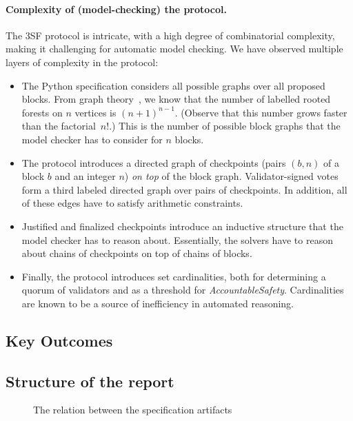 \paragraph{Complexity of (model-checking) the protocol.} The 3SF protocol is
intricate, with a high degree of combinatorial complexity, making it challenging
for automatic model checking. We have observed multiple layers of complexity in the protocol:
\begin{itemize}
  \item The Python specification considers all possible graphs over all proposed
    blocks. From graph theory~\cite{cayley1878theorem}, we know that the number
    of labelled rooted forests on $n$ vertices is ${(n+1)}^{n-1}$. (Observe that
    this number grows faster than the factorial~$n!$.) This is the number of
    possible block graphs that the model checker has to consider for $n$ blocks.
  \item The protocol introduces a directed graph of checkpoints (pairs $(b,n)$
    of a block $b$ and an integer $n$) \emph{on top} of the block graph.
    Validator-signed votes form a third labeled directed graph over pairs of
    checkpoints. In addition, all of these edges have to satisfy arithmetic
    constraints.
  \item Justified and finalized checkpoints introduce an inductive structure
    that the model checker has to reason about. Essentially, the solvers have to
    reason about chains of checkpoints on top of chains of blocks.
  \item Finally, the protocol introduces set cardinalities, both for determining a
    quorum of validators and as a threshold for \textit{AccountableSafety}.
    Cardinalities are known to be a source of inefficiency in automated
    reasoning.
\end{itemize}

\subsection{Key Outcomes}\label{sec:outcomes}



\subsection{Structure of the report}

\begin{figure}
  
  \caption{The relation between the specification artifacts}\label{fig:artifacts}
\end{figure}


